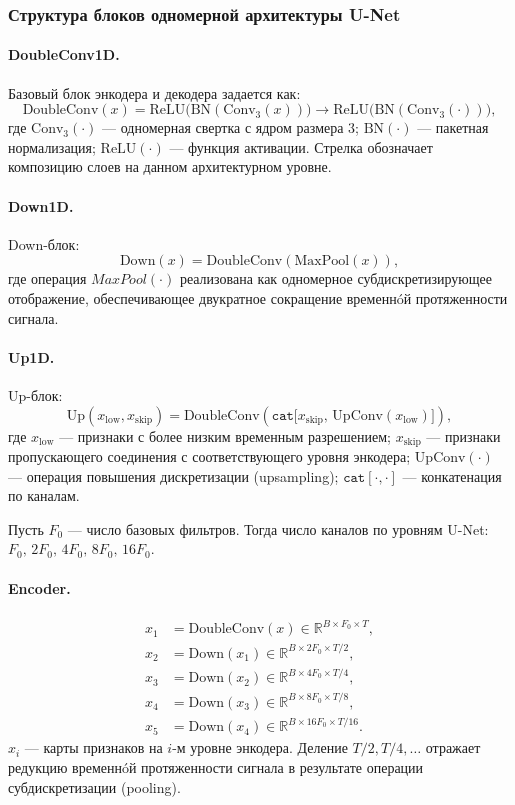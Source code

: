 \documentclass[11pt, oneside, a4paper]{article}
\begin{document}
\subsubsection{Структура блоков одномерной архитектуры U-Net}

\paragraph{DoubleConv1D.}
Базовый блок энкодера и декодера задается как:
\[
\text{DoubleConv}(x)=
\text{ReLU}\big(\text{BN}(\text{Conv}_{3}(x))\big)
\rightarrow
\text{ReLU}\big(\text{BN}(\text{Conv}_{3}(\cdot))\big),
\]
где $\text{Conv}_{3}(\cdot)$ --- одномерная свертка с ядром размера $3$; $\text{BN}(\cdot)$ --- пакетная нормализация; $\text{ReLU}(\cdot)$ --- функция активации. Стрелка обозначает композицию слоев на данном архитектурном уровне.

\paragraph{Down1D.}
Down-блок:
\[
\text{Down}(x) = \text{DoubleConv}(\text{MaxPool}(x)),
\]
где операция $MaxPool(\cdot)$ реализована как одномерное субдискретизирующее отображение, обеспечивающее двукратное сокращение временнóй протяженности сигнала.

\paragraph{Up1D.}
Up-блок:
\[
\text{Up}(x_{\text{low}}, x_{\text{skip}}) =
\text{DoubleConv}\left(\texttt{cat}\big[x_{\text{skip}},\, \text{UpConv}(x_{\text{low}})\big]\right),
\]
где $x_{\text{low}}$ --- признаки с более низким временным разрешением;
$x_{\text{skip}}$ --- признаки пропускающего соединения с соответствующего уровня энкодера;
$\text{UpConv}(\cdot)$ --- операция повышения дискретизации (upsampling);
$\texttt{cat}[\cdot,\cdot]$ --- конкатенация по каналам.

Пусть $F_0$ --- число базовых фильтров. Тогда число каналов по уровням U-Net:
$F_0,\,2F_0,\,4F_0,\,8F_0,\,16F_0$.

\paragraph{Encoder.}
\begin{align*}
x_1 &= \text{DoubleConv}(x) \in \mathbb{R}^{B \times F_0 \times T},\\
x_2 &= \text{Down}(x_1) \in \mathbb{R}^{B \times 2F_0 \times T/2},\\
x_3 &= \text{Down}(x_2) \in \mathbb{R}^{B \times 4F_0 \times T/4},\\
x_4 &= \text{Down}(x_3) \in \mathbb{R}^{B \times 8F_0 \times T/8},\\
x_5 &= \text{Down}(x_4) \in \mathbb{R}^{B \times 16F_0 \times T/16}.
\end{align*}
$x_i$ --- карты признаков на $i$-м уровне энкодера. Деление $T/2, T/4, \dots$ отражает редукцию временнóй протяженности сигнала в результате операции субдискретизации (pooling).
\end{document}
